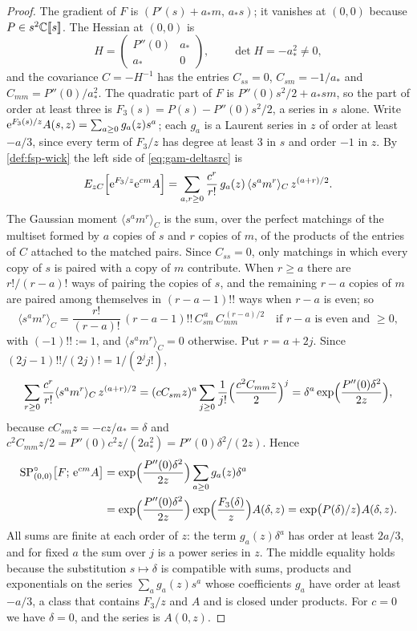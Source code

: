 \begin{proof}
The gradient of $F$ is $(P'(s)+a_*m,\,a_*s)$; it vanishes at $(0,0)$ because $P\in s^2\mathbb{C}[\![ s ]\!]$. The Hessian at $(0,0)$ is
\[
H=\begin{pmatrix}P''(0)&a_*\\ a_*&0\end{pmatrix},\qquad \det H=-a_*^2\neq 0,
\]
and the covariance $C=-H^{-1}$ has the entries $C_{ss}=0$, $C_{sm}=-1/a_*$ and $C_{mm}=P''(0)/a_*^2$. The quadratic part of $F$ is $P''(0)s^2/2+a_*sm$, so the part of order at least three is $F_3(s)=P(s)-P''(0)s^2/2$, a series in $s$ alone. Write $\mathrm{e}^{F_3(s)/z}A(s,z)=\sum_{a\geq 0}g_a(z)s^a$; each $g_a$ is a Laurent series in $z$ of order at least $-a/3$, since every term of $F_3/z$ has degree at least $3$ in $s$ and order $-1$ in $z$. By \cref{def:fsp-wick} the left side of \eqref{eq:gam-deltasrc} is
\[
E_{zC}\Bigl[\mathrm{e}^{F_3/z}\mathrm{e}^{cm}A\Bigr]=\sum_{a,r\geq 0}\frac{c^r}{r!}\,g_a(z)\,\langle s^am^r\rangle_C\,z^{(a+r)/2}.
\]
The Gaussian moment $\langle s^am^r\rangle_C$ is the sum, over the perfect matchings of the multiset formed by $a$ copies of $s$ and $r$ copies of $m$, of the products of the entries of $C$ attached to the matched pairs. Since $C_{ss}=0$, only matchings in which every copy of $s$ is paired with a copy of $m$ contribute. When $r\geq a$ there are $r!/(r-a)!$ ways of pairing the copies of $s$, and the remaining $r-a$ copies of $m$ are paired among themselves in $(r-a-1)!!$ ways when $r-a$ is even; so
\[
\langle s^am^r\rangle_C=\frac{r!}{(r-a)!}\,(r-a-1)!!\,C_{sm}^{\,a}\,C_{mm}^{\,(r-a)/2}\quad\text{if }r-a\text{ is even and }\geq 0,
\]
with $(-1)!!:=1$, and $\langle s^am^r\rangle_C=0$ otherwise. Put $r=a+2j$. Since $(2j-1)!!/(2j)!=1/(2^jj!)$,
\[
\sum_{r\geq 0}\frac{c^r}{r!}\langle s^am^r\rangle_C\,z^{(a+r)/2}=(cC_{sm}z)^a\sum_{j\geq 0}\frac{1}{j!}\Bigl(\frac{c^2C_{mm}z}{2}\Bigr)^j=\delta^a\exp\Bigl(\frac{P''(0)\delta^2}{2z}\Bigr),
\]
because $cC_{sm}z=-cz/a_*=\delta$ and $c^2C_{mm}z/2=P''(0)c^2z/(2a_*^2)=P''(0)\delta^2/(2z)$. Hence
\begin{align*}
\mathrm{SP}^{\circ}_{(0,0)}\bigl[F;\,\mathrm{e}^{cm}A\bigr]&=\exp\Bigl(\frac{P''(0)\delta^2}{2z}\Bigr)\sum_{a\geq 0}g_a(z)\delta^a\\
&=\exp\Bigl(\frac{P''(0)\delta^2}{2z}\Bigr)\exp\Bigl(\frac{F_3(\delta)}{z}\Bigr)A(\delta,z)=\exp\bigl(P(\delta)/z\bigr)A(\delta,z).
\end{align*}
All sums are finite at each order of $z$: the term $g_a(z)\delta^a$ has order at least $2a/3$, and for fixed $a$ the sum over $j$ is a power series in $z$. The middle equality holds because the substitution $s\mapsto\delta$ is compatible with sums, products and exponentials on the series $\sum_ag_a(z)s^a$ whose coefficients $g_a$ have order at least $-a/3$, a class that contains $F_3/z$ and $A$ and is closed under products. For $c=0$ we have $\delta=0$, and the series is $A(0,z)$.
\end{proof}

